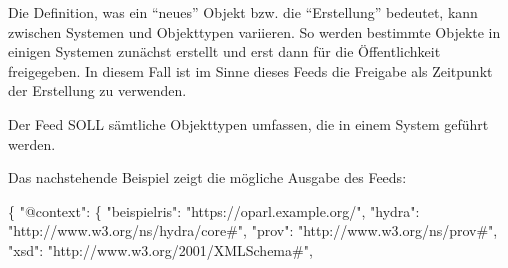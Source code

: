 \documentclass[,a4paper]{article}
\newenvironment{Shaded}{}{}
\newcommand{\DataTypeTok}[1]{\textcolor[rgb]{0.56,0.13,0.00}{{#1}}}
\newcommand{\StringTok}[1]{\textcolor[rgb]{0.25,0.44,0.63}{{#1}}}
\newcommand{\FunctionTok}[1]{\textcolor[rgb]{0.02,0.16,0.49}{{#1}}}
\begin{document}
Die Definition, was ein ``neues'' Objekt bzw. die ``Erstellung''
bedeutet, kann zwischen Systemen und Objekttypen variieren. So werden
bestimmte Objekte in einigen Systemen zunächst erstellt und erst dann
für die Öffentlichkeit freigegeben. In diesem Fall ist im Sinne dieses
Feeds die Freigabe als Zeitpunkt der Erstellung zu verwenden.

Der Feed SOLL sämtliche Objekttypen umfassen, die in einem System
geführt werden.

Das nachstehende Beispiel zeigt die mögliche Ausgabe des Feeds:

\begin{Shaded}
\begin{Highlighting}[]
\FunctionTok{\{}
        \DataTypeTok{"@context"}\FunctionTok{:} \FunctionTok{\{}
                \DataTypeTok{"beispielris"}\FunctionTok{:} \StringTok{"https://oparl.example.org/"}\FunctionTok{,}
                \DataTypeTok{"hydra"}\FunctionTok{:} \StringTok{"http://www.w3.org/ns/hydra/core#"}\FunctionTok{,}
                \DataTypeTok{"prov"}\FunctionTok{:} \StringTok{"http://www.w3.org/ns/prov#"}\FunctionTok{,}
                \DataTypeTok{"xsd"}\FunctionTok{:} \StringTok{"http://www.w3.org/2001/XMLSchema#"}\FunctionTok{,}


\end{Highlighting}
\end{Shaded}
\end{document}
